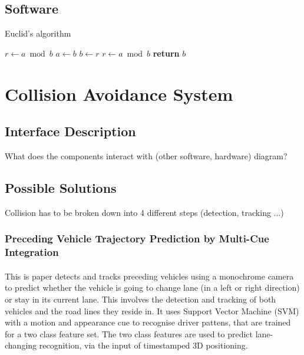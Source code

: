 \documentclass[a4paper]{report}
\begin{document}
\subsection{Software}

\begin{algorithm}
\caption{Euclid's algorithm}\label{euclid}
\begin{algorithmic}[1]
   \State $r\gets a\bmod b$
      \State $a\gets b$
      \State $b\gets r$
      \State $r\gets a\bmod b$
   \EndWhile\label{euclidendwhile}
   \State \textbf{return} $b$
\EndProcedure
\end{algorithmic}
\end{algorithm}


\section{Collision Avoidance System}

\subsection{Interface Description} What does the components interact with (other software, hardware) diagram?

\subsection{Possible Solutions} Collision has to be broken down into 4 different steps (detection, tracking ...)

\subsubsection{Preceding Vehicle Trajectory Prediction by Multi-Cue Integration \citep{multi-cue}}

\paragraph {} This is paper \citep{multi-cue} detects and tracks preceding vehicles using a monochrome camera to predict whether the vehicle is going to change lane (in a left or right direction) or stay in its current lane. This involves the detection and tracking of both vehicles and the road lines they reside in. It uses Support Vector Machine (SVM) with a motion and appearance cue to recognise driver pattens, that are trained for a two class feature set. The two class features are used to predict lane-changing recognition, via the input of timestamped 3D positioning. 
\end{document}
